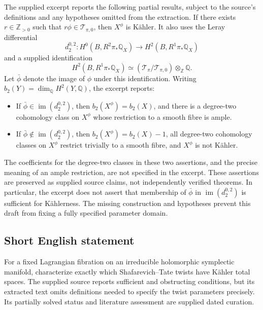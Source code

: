 \documentclass[11pt]{article}
\newcommand{\Z}{\mathbb{Z}}
\newcommand{\Q}{\mathbb{Q}}
\begin{document}
The supplied excerpt reports the following partial results, subject to the source's definitions and any hypotheses omitted from the extraction. If there exists \(r\in\Z_{>0}\) such that \(r\phi\in\mathcal T_{\pi,0}\), then \(X^{\phi}\) is K\"ahler. It also uses the Leray differential
\[
d_2^{0,2}:H^0(B,R^2\pi_*\Q_X)\longrightarrow H^2(B,R^1\pi_*\Q_X)
\]
and a supplied identification
\[
H^2(B,R^1\pi_*\Q_X)\simeq(\mathcal T_{\pi}/\mathcal T_{\pi,0})\otimes_{\Z}\Q.
\]
Let \(\bar\phi\) denote the image of \(\phi\) under this identification. Writing \(b_2(Y)=\dim_{\Q}H^2(Y,\Q)\), the excerpt reports:
\begin{itemize}
\item If \(\bar\phi\in\operatorname{im}(d_2^{0,2})\), then \(b_2(X^{\phi})=b_2(X)\), and there is a degree-two cohomology class on \(X^{\phi}\) whose restriction to a smooth fibre is ample.
\item If \(\bar\phi\notin\operatorname{im}(d_2^{0,2})\), then \(b_2(X^{\phi})=b_2(X)-1\), all degree-two cohomology classes on \(X^{\phi}\) restrict trivially to a smooth fibre, and \(X^{\phi}\) is not K\"ahler.
\end{itemize}
The coefficients for the degree-two classes in these two assertions, and the precise meaning of an ample restriction, are not specified in the excerpt. These assertions are preserved as supplied source claims, not independently verified theorems. In particular, the excerpt does not assert that membership of \(\bar\phi\) in \(\operatorname{im}(d_2^{0,2})\) is sufficient for K\"ahlerness. The missing construction and hypotheses prevent this draft from fixing a fully specified parameter domain.
\subsection{Short English statement}
For a fixed Lagrangian fibration on an irreducible holomorphic symplectic manifold, characterize exactly which Shafarevich--Tate twists have K\"ahler total spaces. The supplied source reports sufficient and obstructing conditions, but its extracted text omits definitions needed to specify the twist parameters precisely. Its partially solved status and literature assessment are supplied dated curation.
\end{document}
